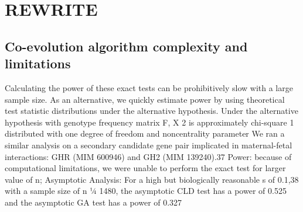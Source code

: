 %

\section{REWRITE}

\subsection{Co-evolution algorithm complexity and limitations}

Calculating the power of these exact tests can be prohibitively slow with a large sample size. As an alternative, we quickly estimate power by using theoretical test statistic distributions under the alternative hypothesis. Under the alternative hypothesis with genotype frequency matrix F, X 2 is approximately chi-square 1 distributed with one degree of freedom and noncentrality parameter \cite{rohlfs2010detecting}
We ran a similar analysis on a secondary candidate gene pair implicated in maternal-fetal interactions: GHR (MIM 600946) and GH2 (MIM 139240).37 \cite{rohlfs2010detecting}
Power: because of computational limitations, we were unable to perform the exact test for larger value of n;  \cite{rohlfs2010detecting}
Asymptotic Analysis: For a high but biologically reasonable s of 0.1,38 with a sample size of n 1⁄4 1480, the asymptotic CLD test has a power of 0.525 and the asymptotic GA test has a power of 0.327 \cite{rohlfs2010detecting}

